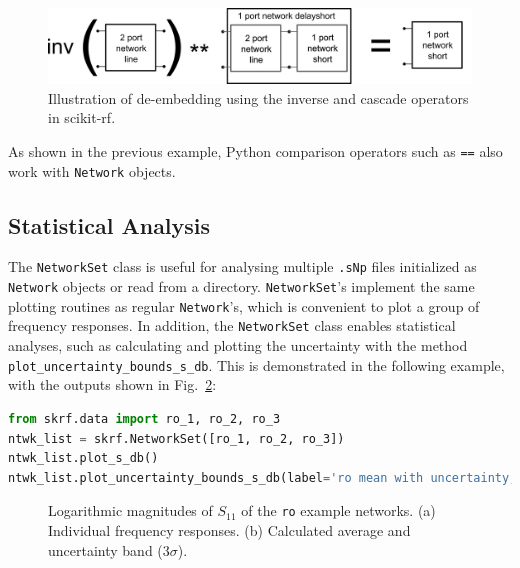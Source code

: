 \documentclass[10pt, letterpaper]{scrartcl}
\newcommand{\skrf}{{s}cikit-rf\xspace}
\begin{document}
\begin{figure}
	\centering
	\includegraphics[width=0.9\linewidth]{figures/deembedding.png}
	\caption{Illustration of de-embedding using the inverse and cascade operators in \skrf{}.}
	\label{fig:deembedding}
\end{figure}

As shown in the previous example, Python comparison operators such as \texttt{==} also work with \texttt{Network} objects. 

\subsection{Statistical Analysis}
The \texttt{NetworkSet} class is useful for analysing multiple \texttt{.sNp} files initialized as \texttt{Network} objects or read from a directory. \texttt{NetworkSet}'s implement the same plotting routines as regular \texttt{Network}'s, which is convenient to plot a group of frequency responses. In addition, the \texttt{NetworkSet} class enables statistical analyses, such as calculating and plotting the uncertainty with the method \texttt{plot\_uncertainty\_bounds\_s\_db}. This is demonstrated in the following example, with the outputs shown in Fig.~\ref{fig:networkset}:

\begin{lstlisting}[language=Python]
from skrf.data import ro_1, ro_2, ro_3
ntwk_list = skrf.NetworkSet([ro_1, ro_2, ro_3])
ntwk_list.plot_s_db()
ntwk_list.plot_uncertainty_bounds_s_db(label='ro mean with uncertainty, S11')
\end{lstlisting}

\begin{figure}
	\centering
	\caption{Logarithmic magnitudes of $S_{11}$ of the \texttt{ro} example networks. (a) Individual frequency responses. (b) Calculated average and uncertainty band ($3 \sigma$).}
	\label{fig:networkset}
\end{figure}
\end{document}
